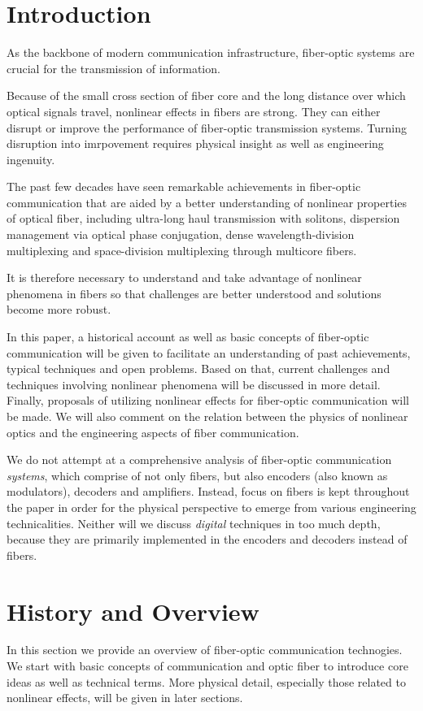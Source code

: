 \documentclass[%
 reprint,
 amsmath,amssymb,
 aps,
]{revtex4-2}
\begin{document}
\section{Introduction}
As the backbone of modern communication infrastructure, 
fiber-optic systems are crucial for 
the transmission of information. 
\par
Because of the small cross section of fiber core 
and the long distance over which optical signals travel, 
nonlinear effects in fibers are strong.
\cite{agrawal_fiber-optic_2022} 
They can either disrupt or improve the performance 
of fiber-optic transmission systems. 
Turning disruption into imrpovement requires 
physical insight as well as engineering ingenuity. 
\par
The past few decades have seen remarkable 
achievements in fiber-optic communication 
that are aided by a better understanding of 
nonlinear properties of optical fiber, including 
ultra-long haul transmission with solitons, 
dispersion management via optical phase conjugation, 
dense wavelength-division multiplexing and 
space-division multiplexing through multicore fibers. 
\par
It is therefore necessary to understand and 
take advantage of nonlinear phenomena in fibers 
so that challenges are better understood and 
solutions become more robust. 
\par
In this paper, a historical account as well as 
basic concepts of fiber-optic communication 
will be given to facilitate an understanding 
of past achievements, typical techniques and open problems. 
Based on that, 
current challenges and techniques involving nonlinear phenomena 
will be discussed in more detail. 
Finally, proposals of utilizing nonlinear effects 
for fiber-optic communication will be made. 
We will also comment on the relation between 
the physics of nonlinear optics 
and the engineering aspects of fiber communication.
\par
We do not attempt at a comprehensive 
analysis of fiber-optic communication \textit{systems}, 
which comprise of not only fibers, but also 
encoders (also known as modulators), decoders and amplifiers. 
Instead, focus on fibers is kept throughout the paper 
in order for the physical perspective to 
emerge from various engineering technicalities. 
Neither will we discuss \textit{digital} techniques 
in too much depth, because they are 
primarily implemented in the encoders and decoders 
instead of fibers. 
\section{History and Overview}
In this section we provide an overview of 
fiber-optic communication technogies. 
We start with basic concepts of communication 
and optic fiber to introduce core ideas as well as 
technical terms. 
More physical detail, especially those related to 
nonlinear effects, will be given in later sections. 
\end{document}
